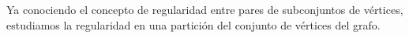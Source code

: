 \documentclass{article}[14pts]
\newcommand{\hh}[1]{{\color{red} * #1 *}}
\newtheorem{prop}{Proposición}
\let\varepsilon=\varepsilon
\begin{document}
%
%
%

Ya conociendo el concepto de regularidad entre pares de subconjuntos de vértices, estudiamos la regularidad en una partición del conjunto de vértices del grafo.\medskip
\end{document}
